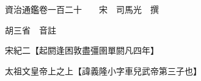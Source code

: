 










 


 
 


 

  
  
  
  
  





  
  
  
  
  
 
  

  

  
  
  



  

 
 

  
   




  

  
  


  　　資治通鑑卷一百二十　　宋　司馬光　撰

　　胡三省　音註

　　宋紀二【起閼逢困敦盡彊圉單閼凡四年】

　　太祖文皇帝上之上【諱義隆小字車兒武帝第三子也】

